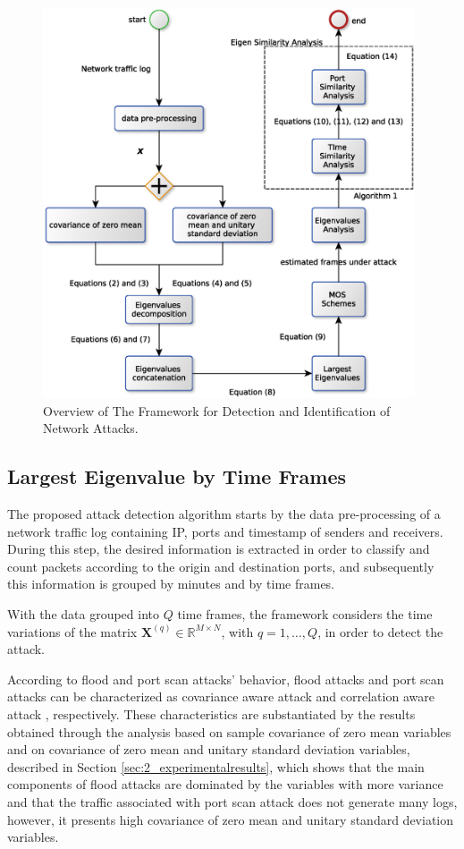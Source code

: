 \begin{figure}[h!]
	\centering
     \includegraphics[width=11cm]{figures/mos_eigen_similarity.eps}
     \caption{Overview of The Framework for Detection and Identification of Network Attacks.}
     \label{fig:2_fig80}
\end{figure}

\subsection{Largest Eigenvalue by Time Frames}
\label{sec:2_prop_LargestEigenvaluebyTimeFrames}

The proposed attack detection algorithm starts by the data pre-processing of a network traffic log containing IP, ports and timestamp of senders and receivers. During this step, the desired information is extracted in order to classify and count packets according to the origin and destination ports, and subsequently this information is grouped by minutes and by time frames.

With the data grouped into $Q$ time frames, the framework considers the time variations of the matrix $\boldsymbol{X}^{(q)} \in \mathbb{R}^{M\times{N}}$, with $q = 1, \ldots, Q$, in order to detect the attack. 

According to flood and port scan attacks' behavior, flood attacks and port scan attacks can be characterized as covariance aware attack \citep{jin2004covariance} and correlation aware attack \citep{lakhina2005mining}, respectively. These characteristics are substantiated by the results obtained through the analysis based on sample covariance of zero mean variables and on covariance of zero mean and unitary standard deviation variables, described in Section \ref{sec:2_experimentalresults}, which shows that the main components of flood attacks are dominated by the variables with more variance and that the traffic associated with port scan attack does not generate many logs, however, it presents high covariance of zero mean and unitary standard deviation variables.

